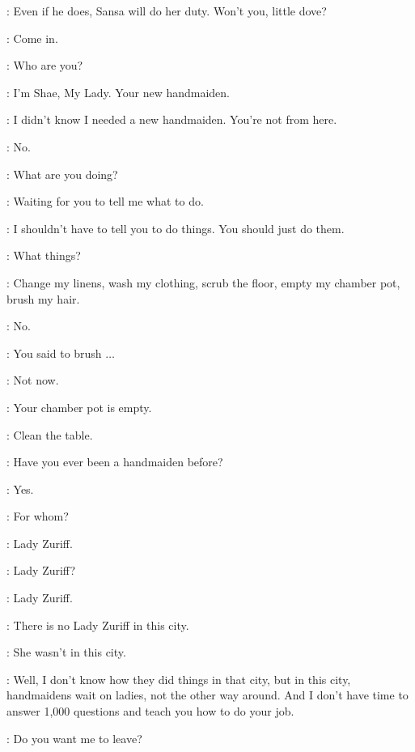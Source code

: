 \CERSEI: Even if he does, Sansa will do her duty. Won't you, little dove? 


\SANSA: Come in. 


\SANSA: Who are you? 

\SHAE: I'm Shae, My Lady. Your new handmaiden. 

\SANSA: I didn't know I needed a new handmaiden. You're not from here. 

\SHAE: No. 

\SANSA: What are you doing? 

\SHAE: Waiting for you to tell me what to do. 

\SANSA: I shouldn't have to tell you to do things. You should just do them. 

\SHAE: What things? 

\SANSA: Change my linens, wash my clothing, scrub the floor, empty my chamber pot, brush my hair. 


\SANSA: No. 

\SHAE: You said to brush $\ldots$  

\SANSA: Not now. 

\SHAE: Your chamber pot is empty. 

\SANSA: Clean the table. 


\SANSA: Have you ever been a handmaiden before? 

\SHAE: Yes. 

\SANSA: For whom? 

\SHAE: Lady Zuriff. 

\SANSA: Lady Zuriff? 

\SHAE: Lady Zuriff. 

\SANSA: There is no Lady Zuriff in this city. 

\SHAE: She wasn't in this city. 

\SANSA: Well, I don't know how they did things in that city, but in this city, handmaidens wait on ladies, not the other way around. And I don't have time to answer 1,000 questions and teach you how to do your job. 

\SHAE: Do you want me to leave? 

